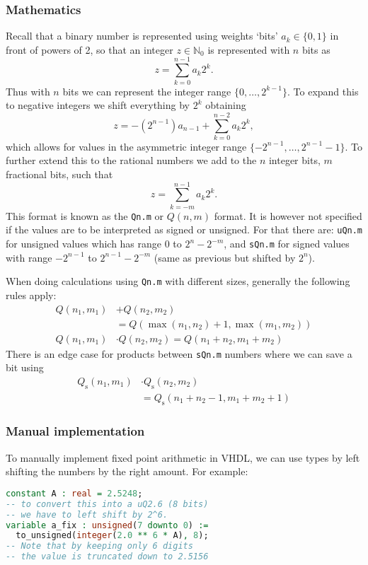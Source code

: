 \documentclass[margin=small]{tex/hsrzf}
\begin{document}
\subsubsection{Mathematics}

Recall that a binary number is represented using weights `bits' \(a_k \in \{ 0, 1 \}\) in front of powers of 2, so that an integer \(z \in \mathbb{N}_0\) is represented with \(n\) bits as
\[
  z = \sum_{k=0}^{n-1} a_k 2^k .
\]
Thus with \(n\) bits we can represent the integer range \(\{0,\ldots, 2^{k-1}\}\).
To expand this to negative integers we shift everything by \(2^k\) obtaining
\[
  z = -(2^{n-1}) a_{n-1} + \sum_{k=0}^{n-2} a_k 2^k,
\]
which allows for values in the asymmetric integer range \(\{-2^{n-1},\ldots, 2^{n-1} -1\}\). To further extend this to the rational numbers we add to the \(n\) integer bits, \(m\) fractional bits, such that
\[
  z = \sum_{k = -m}^{n - 1} a_k 2^k .
\]
This format is known as the \texttt{Qn.m} or \(Q(n,m)\) format. It is however not specified if the values are to be interpreted as signed or unsigned. For that there are: \texttt{uQn.m} for unsigned values which has range 0 to \(2^n - 2^{-m}\), and \texttt{sQn.m} for signed values with range \(-2^{n-1}\) to \(2^{n-1} - 2^{-m}\) (same as previous but shifted by \(2^n\)).

When doing calculations using \texttt{Qn.m} with different sizes, generally the following rules apply:
\begin{align*}
  Q(n_1, m_1) &+ Q(n_2, m_2) \\
    &= Q(\max(n_1, n_2) +1, \max(m_1, m_2)) \\
  Q(n_1, m_1) &\cdot Q(n_2, m_2) = Q(n_1 + n_2, m_1 + m_2)
\end{align*}
There is an edge case for products between \texttt{sQn.m} numbers where we can save a bit using
\begin{align*}
  Q_\mathrm{s}(n_1, m_1) &\cdot Q_\mathrm{s}(n_2, m_2) \\
  &= Q_\mathrm{s}(n_1 + n_2 -1, m_1 + m_2 + 1)
\end{align*}

\subsubsection{Manual implementation}

To manually implement fixed point arithmetic in VHDL, we can use  types by left shifting the numbers by the right amount. For example:
\begin{lstlisting}[language = vhdl]
constant A : real = 2.5248;
-- to convert this into a uQ2.6 (8 bits)
-- we have to left shift by 2^6.
variable a_fix : unsigned(7 downto 0) :=
  to_unsigned(integer(2.0 ** 6 * A), 8);
-- Note that by keeping only 6 digits
-- the value is truncated down to 2.5156
\end{lstlisting}
\end{document}
